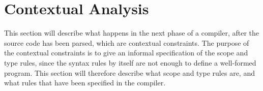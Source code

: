 \section{Contextual Analysis} \label{chap:contextual_analysis}

This section will describe what happens in the next phase of a compiler, 
after the source code has been parsed, which are contextual constraints.
The purpose of the contextual constraints is to give an informal 
specification of the scope and type rules, since the syntax rules by itself
are not enough to define a well-formed program. This section
will therefore describe what scope and type rules are, and what rules that have 
been specified in the compiler.
